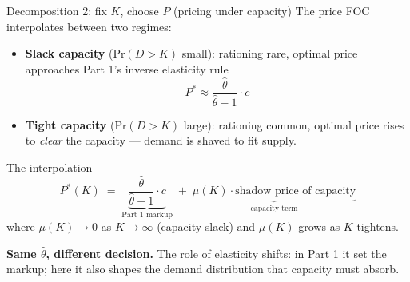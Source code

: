 \documentclass[aspectratio=169, 11pt, handout]{beamer}
\newcommand{\Prob}{\mathrm{Pr}}
\begin{document}
\begin{frame}{Decomposition 2: fix $K$, choose $P$ (pricing under capacity)}
The price FOC interpolates between two regimes:
\vspace{0.4em}

\begin{itemize}
    \item \textbf{Slack capacity} ($\Prob(D > K)$ small): rationing rare, optimal price approaches Part 1's inverse elasticity rule
    \[
    P^* \approx \frac{\hat\theta}{\hat\theta - 1} \cdot c
    \]
    \item \textbf{Tight capacity} ($\Prob(D > K)$ large): rationing common, optimal price rises to \emph{clear} the capacity --- demand is shaved to fit supply.
\end{itemize}
\vspace{0.6em}

\begin{block}{The interpolation}
\[
P^*(K) \;=\; \underbrace{\frac{\hat\theta}{\hat\theta - 1} \cdot c}_{\text{Part 1 markup}} \;+\; \underbrace{\mu(K) \cdot \text{shadow price of capacity}}_{\text{capacity term}}
\]
where $\mu(K) \to 0$ as $K \to \infty$ (capacity slack) and $\mu(K)$ grows as $K$ tightens.
\end{block}
\vspace{0.4em}

\textbf{Same $\hat\theta$, different decision.} The role of elasticity shifts: in Part 1 it set the markup; here it also shapes the demand distribution that capacity must absorb.
\end{frame}
\end{document}
